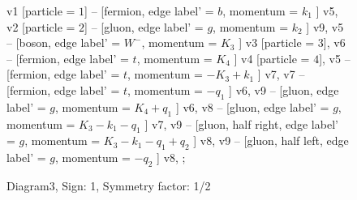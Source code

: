\documentclass{revtex4}
\begin{document}
\begin{figure}[!htb]
\begin{center}
{    %
v1 [particle = \(1\)] -- [fermion, edge label' = \(b\), momentum = \(k_{1}\) ] v5, 
v2 [particle = \(2\)] -- [gluon, edge label' = \(g\), momentum = \(k_{2}\) ] v9, 
v5 -- [boson, edge label' = \(W^{-}\), momentum = \(K_{3}\) ] v3 [particle = \(3\)], 
v6 -- [fermion, edge label' = \(t\), momentum = \(K_{4}\) ] v4 [particle = \(4\)], 
v5 -- [fermion, edge label' = \(t\), momentum = \(-K_{3} + k_{1}\) ] v7, 
v7 -- [fermion, edge label' = \(t\), momentum = \(-q_{1}\) ] v6, 
v9 -- [gluon, edge label' = \(g\), momentum = \(K_{4} + q_{1}\) ] v6, 
v8 -- [gluon, edge label' = \(g\), momentum = \(K_{3} - k_{1} - q_{1}\) ] v7, 
v9 -- [gluon, half right, edge label' = \(g\), momentum = \(K_{3} - k_{1} - q_{1} + q_{2}\) ] v8, 
v9 -- [gluon, half left, edge label' = \(g\), momentum = \(-q_{2}\) ] v8, 
};
\end{center}
\caption{Diagram3, Sign: 1, Symmetry factor: 1/2}
\end{figure}
\newpage
\end{document}
